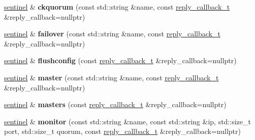 \begin{DoxyCompactItemize}
\hyperlink{classcpp__redis_1_1sentinel}{sentinel} \& {\bfseries ckquorum} (const std\+::string \&name, const \hyperlink{classcpp__redis_1_1sentinel_ae1a150ff8787208c47414397a061c9a7}{reply\+\_\+callback\+\_\+t} \&reply\+\_\+callback=nullptr)
\item 
\mbox{\label{classcpp__redis_1_1sentinel_abd4ee07b5a17ca15b74d25702687e53a}} 
\hyperlink{classcpp__redis_1_1sentinel}{sentinel} \& {\bfseries failover} (const std\+::string \&name, const \hyperlink{classcpp__redis_1_1sentinel_ae1a150ff8787208c47414397a061c9a7}{reply\+\_\+callback\+\_\+t} \&reply\+\_\+callback=nullptr)
\item 
\mbox{\label{classcpp__redis_1_1sentinel_ab3c3a6822ebd512217280b0ca1a0f29f}} 
\hyperlink{classcpp__redis_1_1sentinel}{sentinel} \& {\bfseries flushconfig} (const \hyperlink{classcpp__redis_1_1sentinel_ae1a150ff8787208c47414397a061c9a7}{reply\+\_\+callback\+\_\+t} \&reply\+\_\+callback=nullptr)
\item 
\mbox{\label{classcpp__redis_1_1sentinel_a3d08fbc6ae90b93613f0b3c56a6bf1fe}} 
\hyperlink{classcpp__redis_1_1sentinel}{sentinel} \& {\bfseries master} (const std\+::string \&name, const \hyperlink{classcpp__redis_1_1sentinel_ae1a150ff8787208c47414397a061c9a7}{reply\+\_\+callback\+\_\+t} \&reply\+\_\+callback=nullptr)
\item 
\mbox{\label{classcpp__redis_1_1sentinel_aed4cacf43432630eb2934ce8b8dec104}} 
\hyperlink{classcpp__redis_1_1sentinel}{sentinel} \& {\bfseries masters} (const \hyperlink{classcpp__redis_1_1sentinel_ae1a150ff8787208c47414397a061c9a7}{reply\+\_\+callback\+\_\+t} \&reply\+\_\+callback=nullptr)
\item 
\mbox{\label{classcpp__redis_1_1sentinel_ad4ae72b60a5a03977cda0d3e1f4ee48d}} 
\hyperlink{classcpp__redis_1_1sentinel}{sentinel} \& {\bfseries monitor} (const std\+::string \&name, const std\+::string \&ip, std\+::size\+\_\+t port, std\+::size\+\_\+t quorum, const \hyperlink{classcpp__redis_1_1sentinel_ae1a150ff8787208c47414397a061c9a7}{reply\+\_\+callback\+\_\+t} \&reply\+\_\+callback=nullptr)
\item 
\mbox{\label{classcpp__redis_1_1sentinel_aba0190b2773d4d1f8d5e4c5aac22ce19}} 

\end{DoxyCompactItemize}

